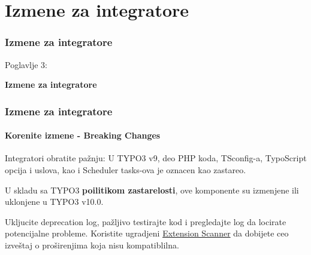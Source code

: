 %

\section{Izmene za integratore}
\begin{frame}[fragile]
	\frametitle{Izmene za integratore}

	\begin{center}\huge{Poglavlje 3:}\end{center}
	\begin{center}\huge{\color{typo3darkgrey}\textbf{Izmene za integratore}}\end{center}

\end{frame}


\begin{frame}[fragile]
	\frametitle{Izmene za integratore}
	\framesubtitle{Korenite izmene - Breaking Changes}

	\small
		Integratori obratite pažnju: U TYPO3 v9, deo PHP koda, TSconfig-a, TypoScript
		opcija i uslova, kao i Scheduler tasks-ova je oznacen kao zastareo.

		\vspace{0.2cm}

		U skladu sa TYPO3 \textbf{poilitikom zastarelosti}, ove komponente su izmenjene
		ili uklonjene u TYPO3 v10.0.

		\vspace{0.2cm}

		Ukljucite deprecation log, pažljivo testirajte kod i pregledajte log da locirate
		potencijalne probleme. Koristite ugradjeni
		\href{https://docs.typo3.org/m/typo3/reference-coreapi/master/en-us/ApiOverview/ExtensionScanner/Index.html}{Extension Scanner}
		da dobijete ceo izveštaj o proširenjima koja nisu kompatiblilna.

	\normalsize

\end{frame}



